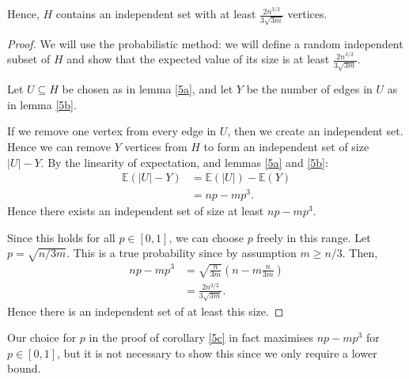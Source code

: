 \documentclass{unswmaths}
\begin{document}
\begin{corollary}[Part (c)]
\label{5c}
    Hence, $H$ contains an independent set with at least $\frac{2n^{3/2}}{3\sqrt{3m}}$
    vertices.
\end{corollary}
\begin{proof}
    We will use the probabilistic method: we will define
    a random independent subset of $H$ and show that the
    expected value of its size is at least $\frac{2n^{3/2}}{3\sqrt{3m}}$.
    
    Let $U \subseteq H$ be chosen as in lemma \ref{5a}, and let
    $Y$ be the number of edges in $U$ as in lemma \ref{5b}. 
    
    If we remove one vertex from every edge in $U$, then we create an independent
    set. Hence we can remove $Y$ vertices from $H$ to form an independent set
    of size $|U|-Y$.
    By the linearity of expectation, and lemmas \ref{5a} and \ref{5b}:
    \begin{align*}
        \mathbb{E}(|U|-Y) &= \mathbb{E}(|U|)-\mathbb{E}(Y)\\
                          &= np - mp^3.
    \end{align*}
    Hence there exists an independent set of size at least $np-mp^3$. 
    
    Since this holds for all $p \in [0,1]$, we can choose $p$ freely
    in this range.
    Let $p = \sqrt{n/3m}$. This is a true probability
    since by assumption $m \geq n/3$. Then,
    \begin{align*}
        np - mp^3 &= \sqrt{\frac{n}{3m}}(n-m\frac{n}{3m})\\
                  &= \frac{2n^{3/2}}{3\sqrt{3m}}.
    \end{align*}
    Hence there is an independent set of at least this size.
\end{proof}

\begin{remark}
    Our choice for $p$ in the proof of corollary \ref{5c} in fact
    maximises $np-mp^3$ for $p \in [0,1]$, but it is not necessary to show this since we only
    require a lower bound.
\end{remark}
\end{document}

